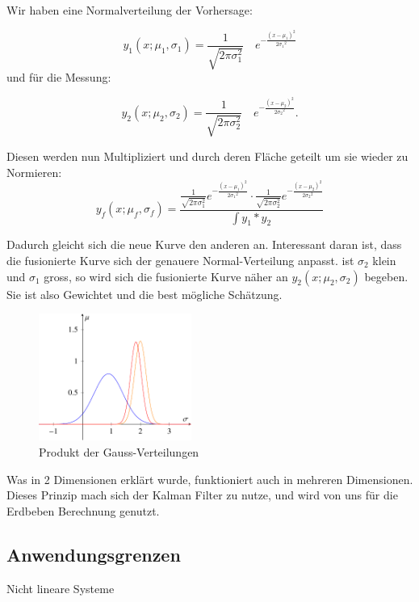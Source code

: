 \documentclass[11pt,a4paper]{article}
\begin{document}
Wir haben eine Normalverteilung der Vorhersage:

\begin{equation}
{y_1}(x;{\mu_1},{\sigma_1})=\frac{1}{\sqrt{2\pi\sigma_1^2}}\quad e^{-\frac{(x-{\mu_1})^2}{2{\sigma_1}^2}}
\end{equation} 
und für die Messung:

\begin{equation}
{y_2}(x;{\mu_2},{\sigma_2})=\frac{1}{\sqrt{2\pi\sigma_2^2}}\quad e^{-\frac{(x-{\mu_2})^2}{2{\sigma_2}^2}}.
\end{equation} 

Diesen werden nun Multipliziert und durch deren Fläche geteilt um sie wieder zu Normieren:
\begin{equation}
{y_f}(x;{\mu_f},{\sigma_f})=\frac{ \frac{1}{\sqrt{2\pi\sigma_1^2}}e^{-\frac{(x-{\mu_1})^2}{2{\sigma_1}^2}} \cdot \frac{1}{\sqrt{2\pi\sigma_2^2}}e^{-\frac{(x-{\mu_2})^2}{2{\sigma_2}^2}}}{\int {y_1}*{y_2}\,}
\end{equation} 

Dadurch gleicht sich die neue Kurve den anderen an. Interessant daran ist, dass die fusionierte Kurve sich der genauere Normal-Verteilung anpasst. ist ${\sigma_2}$ klein und ${\sigma_1}$ gross, so wird sich die fusionierte Kurve näher an ${y_2}(x;{\mu_2},{\sigma_2})$ begeben. Sie ist also Gewichtet und die best mögliche Schätzung. 

 \begin{figure}[h]
 \begin{center}
 \includegraphics[width=5cm]{papers/erdbeben/Gausskurve3}
 \caption{Produkt der Gauss-Verteilungen}
 \end{center}
\end{figure}
Was in 2 Dimensionen erklärt wurde, funktioniert auch in mehreren Dimensionen. Dieses Prinzip mach sich der Kalman Filter zu nutze, und wird von uns für die Erdbeben Berechnung genutzt. 

\subsection{Anwendungsgrenzen}
Nicht lineare Systeme %
\end{document}
